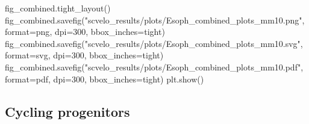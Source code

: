 \documentclass[
  letterpaper,
  DIV=11,
  numbers=noendperiod]{scrreprt}
\newenvironment{Shaded}{\begin{snugshade}}{\end{snugshade}}
\newcommand{\BuiltInTok}[1]{\textcolor[rgb]{0.00,0.23,0.31}{#1}}
\newcommand{\DecValTok}[1]{\textcolor[rgb]{0.68,0.00,0.00}{#1}}
\newcommand{\NormalTok}[1]{\textcolor[rgb]{0.00,0.23,0.31}{#1}}
\newcommand{\OperatorTok}[1]{\textcolor[rgb]{0.37,0.37,0.37}{#1}}
\newcommand{\StringTok}[1]{\textcolor[rgb]{0.13,0.47,0.30}{#1}}
\begin{document}
\begin{Shaded}
\begin{Highlighting}[]
\NormalTok{fig\_combined.tight\_layout()}
\NormalTok{fig\_combined.savefig(}\StringTok{"scvelo\_results/plots/Esoph\_combined\_plots\_mm10.png"}\NormalTok{, }\BuiltInTok{format}\OperatorTok{=}\StringTok{\textquotesingle{}png\textquotesingle{}}\NormalTok{, dpi}\OperatorTok{=}\DecValTok{300}\NormalTok{, bbox\_inches}\OperatorTok{=}\StringTok{\textquotesingle{}tight\textquotesingle{}}\NormalTok{)}
\NormalTok{fig\_combined.savefig(}\StringTok{"scvelo\_results/plots/Esoph\_combined\_plots\_mm10.svg"}\NormalTok{, }\BuiltInTok{format}\OperatorTok{=}\StringTok{\textquotesingle{}svg\textquotesingle{}}\NormalTok{, dpi}\OperatorTok{=}\DecValTok{300}\NormalTok{, bbox\_inches}\OperatorTok{=}\StringTok{\textquotesingle{}tight\textquotesingle{}}\NormalTok{)}
\NormalTok{fig\_combined.savefig(}\StringTok{"scvelo\_results/plots/Esoph\_combined\_plots\_mm10.pdf"}\NormalTok{, }\BuiltInTok{format}\OperatorTok{=}\StringTok{\textquotesingle{}pdf\textquotesingle{}}\NormalTok{, dpi}\OperatorTok{=}\DecValTok{300}\NormalTok{, bbox\_inches}\OperatorTok{=}\StringTok{\textquotesingle{}tight\textquotesingle{}}\NormalTok{)}
\NormalTok{plt.show()}
\end{Highlighting}
\end{Shaded}

\subsection{Cycling progenitors}\label{cycling-progenitors}
\end{document}
